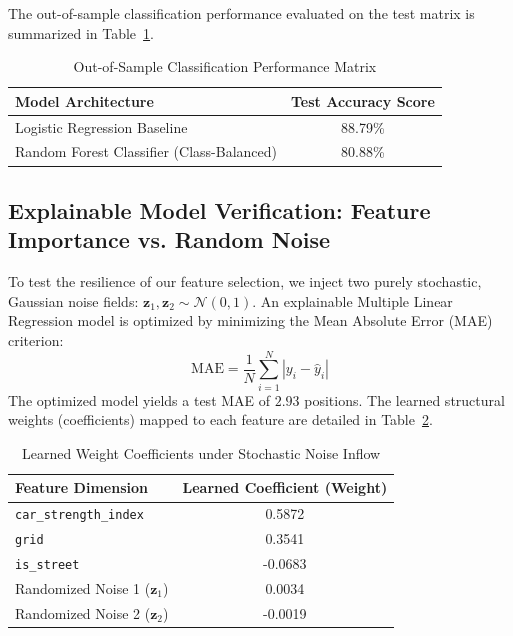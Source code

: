 \noindent The out-of-sample classification performance evaluated on the test matrix is summarized in Table~\ref{tab:classification_results}.

\begin{table}[h!]
\centering
\caption{Out-of-Sample Classification Performance Matrix}
\label{tab:classification_results}
\begin{tabular}{lc}
\toprule
\textbf{Model Architecture} & \textbf{Test Accuracy Score} \\
\midrule
Logistic Regression Baseline & 88.79\% \\
Random Forest Classifier (Class-Balanced) & 80.88\% \\
\bottomrule
\end{tabular}
\end{table}

\subsection{Explainable Model Verification: Feature Importance vs. Random Noise}
\label{subsec:explainable_noise}

To test the resilience of our feature selection, we inject two purely stochastic, Gaussian noise fields: $\mathbf{z}_1, \mathbf{z}_2 \sim \mathcal{N}(0, 1)$. An explainable Multiple Linear Regression model is optimized by minimizing the Mean Absolute Error (MAE) criterion:
\begin{equation}
\text{MAE} = \frac{1}{N} \sum_{i=1}^{N} |y_i - \hat{y}_i|
\end{equation}
The optimized model yields a test MAE of $2.93$ positions. The learned structural weights (coefficients) mapped to each feature are detailed in Table~\ref{tab:explainable_weights}.

\begin{table}[h!]
\centering
\caption{Learned Weight Coefficients under Stochastic Noise Inflow}
\label{tab:explainable_weights}
\begin{tabular}{lc}
\toprule
\textbf{Feature Dimension} & \textbf{Learned Coefficient (Weight)} \\
\midrule
\texttt{car\_strength\_index}  & 0.5872 \\
\texttt{grid}                  & 0.3541 \\
\texttt{is\_street}            & -0.0683 \\
Randomized Noise 1 ($\mathbf{z}_1$) & 0.0034 \\
Randomized Noise 2 ($\mathbf{z}_2$) & -0.0019 \\
\bottomrule
\end{tabular}
\end{table}

